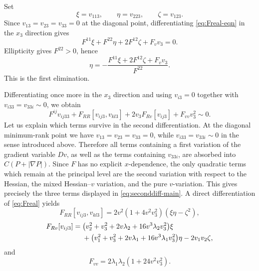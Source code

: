 \documentclass{article}
\numberwithin{equation}{section}
\begin{document}
Set
\begin{equation}\label{eq:thirdvars}
\xi=v_{113},
\qquad
\eta=v_{223},
\qquad
\zeta=v_{123}.
\end{equation}
Since $v_{13}=v_{23}=v_{33}=0$ at the diagonal point, differentiating \eqref{eq:Freal-eqn} in the $x_3$ direction gives
\begin{equation}\label{eq:firstdiff-main}
F^{11}\xi+F^{22}\eta+2F^{12}\zeta+F_vv_3=0.
\end{equation}
Ellipticity gives $F^{22}>0$, hence
\begin{equation}\label{eq:eta-main}
\eta=-\frac{F^{11}\xi+2F^{12}\zeta+F_vv_3}{F^{22}}.
\end{equation}
This is the first elimination.

Differentiating once more in the $x_3$ direction and using $v_{i3}=0$ together with $v_{i33}=v_{33i}\sim0$, we obtain
\begin{equation}\label{eq:seconddiff-main}
F^{ij}v_{ij33}
+F_{RR}[v_{ij3},v_{kl3}]
+2v_3F_{Rv}[v_{ij3}]
+F_{vv}v_3^2\sim0.
\end{equation}
Let us explain which terms survive in the second differentiation. At the diagonal minimum-rank point we have
\(v_{13}=v_{23}=v_{33}=0\), while
\(v_{i33}=v_{33i}\sim0\) in the sense introduced above.
Therefore all terms containing a first variation of the gradient
variable \(Dv\), as well as the terms containing \(v_{33i}\), are
absorbed into \(C(P+|\nabla P|)\). Since \(F\) has no explicit
\(x\)-dependence, the only quadratic terms which remain at the
principal level are the second variation with respect to the Hessian,
the mixed Hessian--\(v\) variation, and the pure \(v\)-variation.
This gives precisely the three terms displayed in \eqref{eq:seconddiff-main}.
A direct differentiation of \eqref{eq:Freal} yields
\begin{equation}\label{eq:Frr-main}
F_{RR}[v_{ij3},v_{kl3}]
=2v^2(1+4v^2v_3^2)(\xi\eta-\zeta^2),
\end{equation}
\begin{align}
F_{Rv}[v_{ij3}]
={}&\bigl(v_2^2+v_3^2+2v\lambda_2+16v^3\lambda_2v_3^2\bigr)\xi
\notag\\
&+\bigl(v_1^2+v_3^2+2v\lambda_1+16v^3\lambda_1v_3^2\bigr)\eta
-2v_1v_2\zeta,
\label{eq:Frv-main}
\end{align}
and
\begin{equation}\label{eq:Fvv-main}
F_{vv}=2\lambda_1\lambda_2(1+24v^2v_3^2).
\end{equation}
\end{document}

